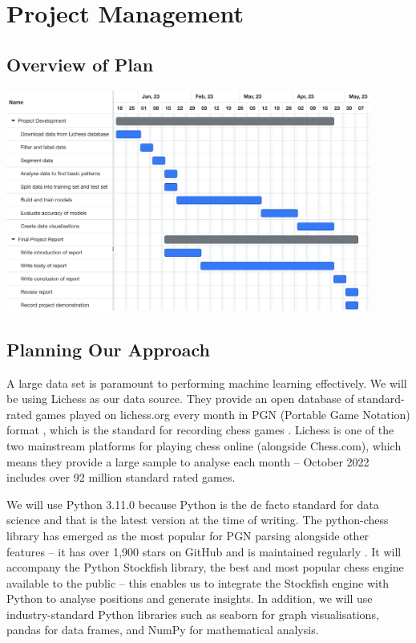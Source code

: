 \documentclass[%
 superscriptaddress,
showpacs,preprintnumbers,
 amsmath,
 amssymb,
 aps,
 pra,
showkeys,
onecolumn,
notitlepage,
11pt,
tightenlines      %
]{revtex4-1}
\begin{document}
\section{Project Management}

\subsection{Overview of Plan}
\begin{center}
    \includegraphics[width=0.9\textwidth]{images/Gantt Chart - Project Management.png}
\end{center}

\subsection{Planning Our Approach}
A large data set is paramount to performing machine learning effectively. We will be using Lichess as our data source. They provide an open database of standard-rated games played on lichess.org every month in PGN (Portable Game Notation) format \cite{lichessOpenDatabase}, which is the standard for recording chess games \cite{pgnExplanation}. Lichess is one of the two mainstream platforms for playing chess online (alongside Chess.com), which means they provide a large sample to analyse each month -- October 2022 includes over 92 million standard rated games.

We will use Python 3.11.0 because Python is the de facto standard for data science \cite{pythonForDataScience} and that is the latest version at the time of writing. The python-chess library has emerged as the most popular for PGN parsing alongside other features -- it has over 1,900 stars on GitHub and is maintained regularly \cite{pythonChessLibrary}. It will accompany the Python Stockfish library, the best and most popular chess engine available to the public \cite{aboutStockfish} -- this enables us to integrate the Stockfish engine with Python to analyse positions and generate insights. In addition, we will use industry-standard Python libraries such as seaborn for graph visualisations, pandas for data frames, and NumPy for mathematical analysis.
\end{document}
